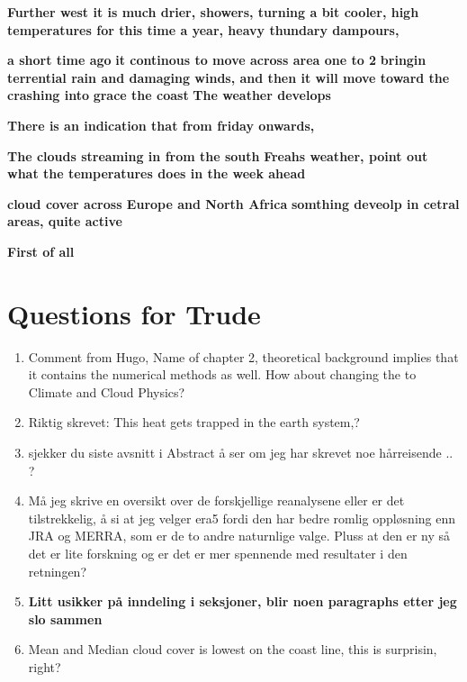 \textbf{Further west it is much drier, showers, turning a bit cooler, high temperatures for this time a year, heavy thundary dampours, }

\textbf{a short time ago}
\textbf{it continous to move across area one to 2}
\textbf{bringin terrential rain and damaging winds, and then it will move toward the }
\textbf{crashing into }
\textbf{grace the coast}
\textbf{The weather develops}

\textbf{There is an indication that from friday onwards, }

\textbf{The clouds streaming in from the south}
\textbf{Freahs weather, point out what the temperatures does in the week ahead}

\textbf{cloud cover across Europe and North Africa}
\textbf{somthing deveolp in cetral areas, quite active}

\textbf{First of all}


\section{Questions for Trude}
\begin{enumerate}
    \item Comment from Hugo, Name of chapter 2, theoretical background implies that it contains the numerical methods as well. How about changing the to Climate and Cloud Physics?
    \item Riktig skrevet: This heat gets trapped in the earth system,?
    \item sjekker du siste avsnitt i Abstract å ser om jeg har skrevet noe hårreisende .. ?
    \item Må jeg skrive en oversikt over de forskjellige reanalysene eller er det tilstrekkelig, å si at jeg velger \acrshort{era5} fordi den har bedre romlig oppløsning enn JRA og MERRA, som er de to andre naturnlige valge. Pluss at den er ny så det er lite forskning og er det er mer spennende med resultater i den retningen?
    \item \textbf{Litt usikker på inndeling i seksjoner, blir noen paragraphs etter jeg slo sammen }
    \item Mean and Median cloud cover is lowest on the coast line, this is surprisin, right?
\end{enumerate}

